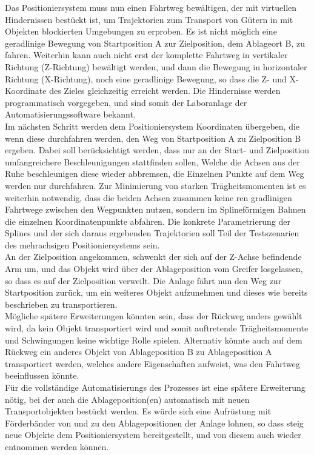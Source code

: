 \documentclass[../Bachelorarbeit.tex]{subfiles}
\begin{document}
Das Positioniersystem muss nun einen Fahrtweg bewältigen, der mit virtuellen Hindernissen bestückt ist, um Trajektorien zum Transport von Gütern in mit Objekten blockierten Umgebungen zu erproben. Es ist nicht möglich eine geradlinige Bewegung von Startposition A zur Zielposition, dem Ablageort B, zu fahren. Weiterhin kann auch nicht erst der komplette Fahrtweg in vertikaler Richtung (Z-Richtung) bewältigt werden, und dann die Bewegung in  horizontaler Richtung (X-Richtung), noch eine geradlinige Bewegung, so dass die Z- und X-Koordinate des Zieles gleichzeitig erreicht werden. Die Hindernisse werden programmatisch vorgegeben, und sind somit der Laboranlage \bzw der Automatisierungssoftware bekannt.\\
Im nächsten Schritt werden dem Positioniersystem Koordinaten übergeben, die wenn diese durchfahren werden, den Weg von Startposition A zu Zielposition B ergeben. Dabei soll berücksichtigt werden, dass nur an der Start- und Zielposition umfangreichere Beschleunigungen stattfinden sollen, Welche die Achsen aus der Ruhe beschleunigen \bzw diese wieder abbremsen, die Einzelnen Punkte auf dem Weg werden nur durchfahren. Zur Minimierung von starken Trägheitsmomenten ist es weiterhin notwendig, dass die beiden Achsen zusammen keine ren gradlinigen Fahrtwege zwischen den Wegpunkten nutzen, sondern im Splineförmigen Bahnen die einzelnen Koordinatenpunkte abfahren. Die konkrete Parametrierung der Splines und der sich daraus ergebenden Trajektorien soll Teil der Testszenarien des mehrachsigen Positioniersystems sein.\\
An der Zielposition angekommen, schwenkt der sich auf der Z-Achse befindende Arm um, und das Objekt wird über der Ablageposition vom Greifer losgelassen, so dass es auf der Zielposition verweilt. Die Anlage fährt nun den Weg zur Startposition zurück, um ein weiteres Objekt aufzunehmen und dieses wie bereits beschrieben zu transportieren.\\
Mögliche spätere Erweiterungen könnten sein, dass der Rückweg anders gewählt wird, da kein Objekt transportiert wird und somit auftretende Trägheitsmomente und Schwingungen keine wichtige Rolle spielen. Alternativ könnte auch auf dem Rückweg ein anderes Objekt von Ablageposition B zu Ablageposition A transportiert werden, welches andere Eigenschaften aufweist, was den Fahrtweg beeinflussen könnte.\\
Für die vollständige Automatisierungs des Prozesses ist eine spätere Erweiterung nötig, bei der auch die Ablageposition(en) automatisch mit neuen Transportobjekten bestückt werden. Es würde sich eine Aufrüstung mit Förderbänder von und zu den Ablagepositionen der Anlage lohnen, so dass steig neue Objekte dem Positioniersystem bereitgestellt, und von diesem auch wieder entnommen werden können.\\
\end{document}
